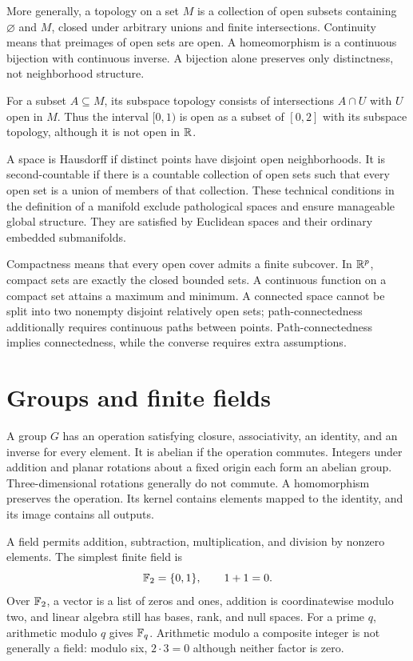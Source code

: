 More generally, a topology on a set \(M\) is a collection of open subsets containing \(\varnothing\) and \(M\), closed under arbitrary unions and finite intersections. Continuity means that preimages of open sets are open. A homeomorphism is a continuous bijection with continuous inverse. A bijection alone preserves only distinctness, not neighborhood structure.

For a subset \(A\subseteq M\), its subspace topology consists of intersections \(A\cap U\) with \(U\) open in \(M\). Thus the interval \([0,1)\) is open as a subset of \([0,2]\) with its subspace topology, although it is not open in \(\mathbb{R}\).

A space is Hausdorff if distinct points have disjoint open neighborhoods. It is second-countable if there is a countable collection of open sets such that every open set is a union of members of that collection. These technical conditions in the definition of a manifold exclude pathological spaces and ensure manageable global structure. They are satisfied by Euclidean spaces and their ordinary embedded submanifolds.

Compactness means that every open cover admits a finite subcover. In \(\mathbb{R}^p\), compact sets are exactly the closed bounded sets. A continuous function on a compact set attains a maximum and minimum. A connected space cannot be split into two nonempty disjoint relatively open sets; path-connectedness additionally requires continuous paths between points. Path-connectedness implies connectedness, while the converse requires extra assumptions.

\section{Groups and finite fields}
A group \(G\) has an operation satisfying closure, associativity, an identity, and an inverse for every element. It is abelian if the operation commutes. Integers under addition and planar rotations about a fixed origin each form an abelian group. Three-dimensional rotations generally do not commute. A homomorphism preserves the operation. Its kernel contains elements mapped to the identity, and its image contains all outputs.

A field permits addition, subtraction, multiplication, and division by nonzero elements. The simplest finite field is
\[
\mathbb{F}_2=\{0,1\},\qquad 1+1=0.
\]
Over \(\mathbb{F}_2\), a vector is a list of zeros and ones, addition is coordinatewise modulo two, and linear algebra still has bases, rank, and null spaces. For a prime \(q\), arithmetic modulo \(q\) gives \(\mathbb{F}_q\). Arithmetic modulo a composite integer is not generally a field: modulo six, \(2\cdot3=0\) although neither factor is zero.


